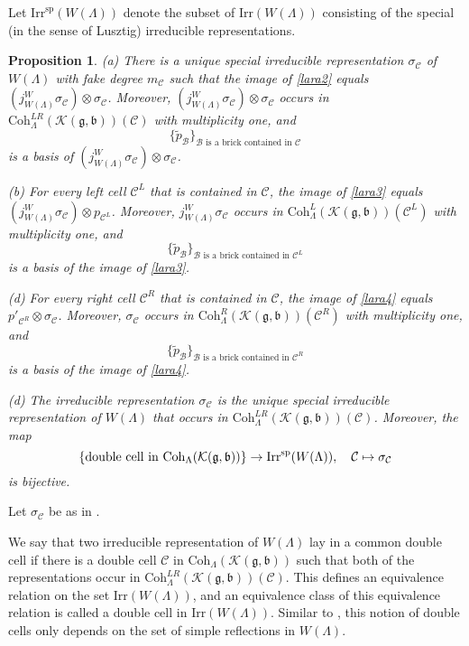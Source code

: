 \documentclass[12pt,a4paper]{amsart}
\newcommand{\CB}{{\mathcal {B}}}
\newcommand{\CC}{{\mathcal {C}}}
\newcommand{\CK}{{\mathcal {K}}}
\newcommand{\g}{\mathfrak g}
\renewcommand{\b}{\mathfrak b}
\numberwithin{equation}{section}
\newtheorem{prop}[thm]{Proposition}
\theoremstyle{remark}
\def\Irr{\mathrm{Irr}}
\def\Coh{\mathrm{Coh}}
\begin{document}
Let  $\Irr^{\mathrm{sp}}(W(\Lambda))$ denote the subset of $\Irr(W(\Lambda))$ consisting of the special (in the sense of Lusztig) irreducible representations.
\begin{prop}\label{cell00}
\noindent (a) There is a unique special irreducible representation $\sigma_\CC$ of $W(\Lambda)$ with fake degree $m_\CC$ such that  the image of \eqref{lara2} equals $\left(j_{W(\Lambda)}^W\sigma_\CC\right)\otimes \sigma_\CC$.  Moreover, $\left(j_{W(\Lambda)}^W\sigma_\CC\right)\otimes \sigma_\CC$  occurs in  $\Coh^{LR}_{\Lambda}( \CK(\g,\b))( \CC)$ with multiplicity one, and
\[
\{\tilde p_{\CB}\}_{\CB\textrm{ is a brick contained in $\CC$}}
\]
 is a basis of $\left(j_{W(\Lambda)}^W\sigma_\CC\right)\otimes \sigma_\CC$.


\noindent
(b)
For every  left cell $\CC^L$ that is contained in $\CC$, the image of \eqref{lara3} equals $\left(j_{W(\Lambda)}^W\sigma_\CC\right)\otimes  p_{\CC^L}$. Moreover, $j_{W(\Lambda)}^W\sigma_\CC$ occurs in $\Coh^{L}_{\Lambda}( \CK(\g,\b))( \CC^L)$ with multiplicity one, and
\[
\{\tilde p_{\CB} \}_{\CB\textrm{ is a brick contained in $\CC^L$}}
\]
 is a basis of the image of  \eqref{lara3}.

\noindent (d)
For every  right cell $\CC^R$ that is contained in $\CC$, the image of \eqref{lara4} equals $p'_{\CC^R}\otimes \sigma_\CC$. Moreover, $\sigma_\CC$ occurs in $\Coh^{R}_{\Lambda}( \CK(\g,\b))( \CC^R)$ with multiplicity one, and
\[
\{\tilde p_{\CB} \}_{\CB\textrm{ is a brick contained in $\CC^R$}}
\]
 is a basis of the image of  \eqref{lara4}.

\noindent (d)
The irreducible representation $\sigma_\CC$ is the unique special irreducible representation of $W(\Lambda)$ that occurs in $\Coh^{LR}_{\Lambda}( \CK(\g,\b))( \CC)$. Moreover, the map
\[
  \{\textrm{double cell in $ \Coh_{\Lambda}( \CK(\g,\b))$}\}\rightarrow \Irr^{\mathrm{sp}}(W(\Lambda)), \quad \CC\mapsto \sigma_\CC
\]
is bijective.

\end{prop}


Let $\sigma_\CC$ be as in .

We say that two irreducible representation of  $W(\Lambda)$ lay in a common double cell if there is a double cell $\CC$ in $\Coh_{\Lambda}( \CK(\g,\b))$ such that both of the representations occur in $\Coh^{LR}_{\Lambda}( \CK(\g,\b))( \CC)$. This defines an equivalence relation on the set $\Irr(W(\Lambda))$, and an equivalence class of this equivalence relation is called a double cell in  $\Irr(W(\Lambda))$. Similar to , this notion of double cells only depends on the set of simple reflections in $W(\Lambda)$.
\end{document}
